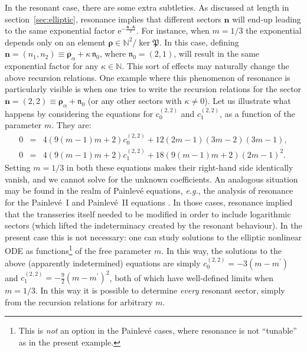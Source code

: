 \documentclass[11pt,a4paper]{article}
\def\BN{{\mathbb N}}
\newcommand{\nres}{\boldsymbol{\mathfrak{n}}_0}
\newcommand{\rme}{{\mathrm{e}}}
\begin{document}
In the resonant case, there are some extra subtleties. As discussed at length in section~\ref{sec:elliptic}, resonance implies that different sectors $\boldsymbol{n}$ will end-up leading to the same exponential factor $\rme^{-\frac{\boldsymbol{n} \cdot  \boldsymbol{A}}{x}}$. For instance, when $m=1/3$ the exponential depends only on an element $\boldsymbol{\rho} \in \BN^2/\ker \mathfrak{P}$. In this case, defining $\boldsymbol{n} = \left(n_1, n_2\right) \equiv \boldsymbol{\rho}_\alpha + \kappa\, \nres$, where $\nres = \left(2,1\right)$, will result in the same exponential factor for any $\kappa \in \BN$. This sort of effects may naturally change the above recursion relations. One example where this phenomenon of resonance is particularly visible is when one tries to write the recursion relations for the sector $\boldsymbol{n} = \left(2,2\right) \equiv \boldsymbol{\rho}_\alpha + \nres$ (or any other sectors with $\kappa \neq 0$). Let us illustrate what happens by considering the equations for $c^{(2,2)}_0$ and $c^{(2,2)}_1$, as a function of the parameter $m$. They are:
%
\begin{eqnarray}
0 &=& 4 \left( 9 \left(m-1\right) m + 2 \right) c^{(2,2)}_0 + 12 \left(2m-1\right) \left(3m-2\right) \left(3m-1\right), \\
0 &=& 4 \left( 9 \left(m-1\right) m + 2 \right) c^{(2,2)}_1 + 18 \left( 9 \left(m-1\right) m + 2 \right) \left(2m-1\right)^2.
\end{eqnarray}
%
\noindent
Setting $m=1/3$ in both these equations makes their right-hand side identically vanish, and we cannot solve for the unknown coefficients. An analogous situation may be found in the realm of Painlev\'e equations, \textit{e.g.}, the analysis of resonance for the Painlev\'e~I \cite{gikm10, asv11} and Painlev\'e~II equations \cite{sv13}. In those cases, resonance implied that the transseries itself needed to be modified in order to include logarithmic sectors (which lifted the indeterminacy created by the resonant behaviour). In the present case this is not necessary: one can study solutions to the elliptic nonlinear ODE as functions\footnote{This is \textit{not} an option in the  Painlev\'e cases, where resonance is not ``tunable'' as in the present example.} of the free parameter $m$. In this way, the solutions to the above (apparently indetermined) equations are simply $c^{(2,2)}_0 = - 3 \left( m-m^\prime \right)$ and $c^{(2,2)}_1 = - \frac{9}{2} \left( m-m^\prime \right)^2$, both of which have well-defined limits when $m=1/3$. In this way it is possible to determine \textit{every} resonant sector, simply from the recursion relations for arbitrary $m$.
\end{document}
